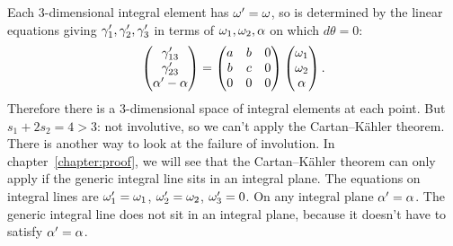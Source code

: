 Each \(3\)-dimensional integral element has \(\omega'=\omega\), so is determined by the linear equations giving \(\gamma'_1, \gamma'_2, \gamma'_3\) in terms of \(\omega_1, \omega_2, \alpha\) on which \(d\theta=0\):
\[
\begin{pmatrix} 
\gamma'_{13} \\
\gamma'_{23} \\
\alpha'-\alpha
\end{pmatrix}
=
\begin{pmatrix}
a & b & 0 \\
b & c & 0 \\
0 & 0 & 0
\end{pmatrix} 
\begin{pmatrix}
\omega_1 \\
\omega_2 \\
\alpha
\end{pmatrix}.
\]
Therefore there is a \(3\)-dimensional space of integral elements at each point.
But \(s_1+2s_2=4>3\): not involutive, so we can't apply the Cartan--K\"ahler theorem.
There is another way to look at the failure of involution.
In chapter~\ref{chapter:proof}, we will see that the Cartan--K\"ahler theorem can only apply if the generic integral line sits in an integral plane.
The equations on integral lines are \(\omega'_1=\omega_1\), \(\omega'_2=\omega_2\), \(\omega'_3=0\).
On any integral plane \(\alpha'=\alpha\).
The generic integral line does not sit in an integral plane, because it doesn't have to satisfy \(\alpha'=\alpha\).

